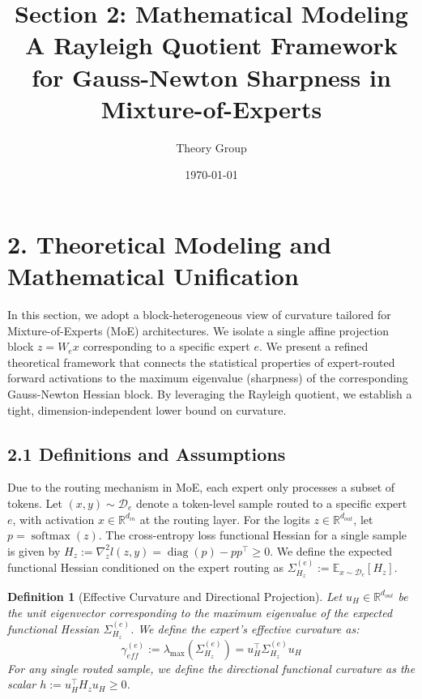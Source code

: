 \documentclass[11pt]{article}
\title{Section 2: Mathematical Modeling \\
\large A Rayleigh Quotient Framework for Gauss-Newton Sharpness in Mixture-of-Experts}
\author{Theory Group}
\date{\today}
\newtheorem{definition}{Definition}
\begin{document}
\maketitle

\section*{2. Theoretical Modeling and Mathematical Unification}

In this section, we adopt a block-heterogeneous view of curvature tailored for Mixture-of-Experts (MoE) architectures. We isolate a single affine projection block $z=W_e x$ corresponding to a specific expert $e$. We present a refined theoretical framework that connects the statistical properties of expert-routed forward activations to the maximum eigenvalue (sharpness) of the corresponding Gauss-Newton Hessian block. By leveraging the Rayleigh quotient, we establish a tight, dimension-independent lower bound on curvature.

\subsection*{2.1 Definitions and Assumptions}

Due to the routing mechanism in MoE, each expert only processes a subset of tokens. Let $(x,y)\sim\mathcal{D}_e$ denote a token-level sample routed to a specific expert $e$, with activation $x\in\mathbb{R}^{d_{in}}$ at the routing layer. For the logits $z\in\mathbb{R}^{d_{out}}$, let $p = \operatorname{softmax}(z)$. The cross-entropy loss functional Hessian for a single sample is given by $H_{z} := \nabla_z^2 l(z,y) = \operatorname{diag}(p) - pp^\top \ge 0$. We define the expected functional Hessian conditioned on the expert routing as $\Sigma_{H_z}^{(e)} := \mathbb{E}_{x \sim \mathcal{D}_e}[H_z]$.

\begin{definition}[Effective Curvature and Directional Projection]
Let $u_H\in\mathbb{R}^{d_{out}}$ be the unit eigenvector corresponding to the maximum eigenvalue of the expected functional Hessian $\Sigma_{H_z}^{(e)}$. We define the expert's effective curvature as:
\begin{equation}
    \gamma_{eff}^{(e)} := \lambda_{\max}(\Sigma_{H_z}^{(e)}) = u_H^\top \Sigma_{H_z}^{(e)} u_H
\end{equation}
For any single routed sample, we define the directional functional curvature as the scalar $h := u_H^\top H_z u_H \ge 0$.
\end{definition}
\end{document}
